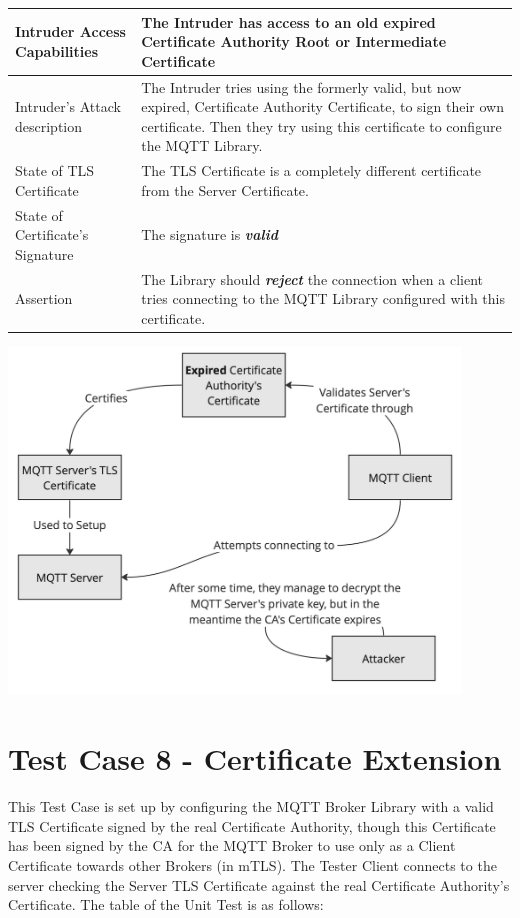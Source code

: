 \documentclass[binding=0.6cm,noexaminfo]{sapthesis}
\begin{document}
\begin{center}
\begin{tabular}{| p{6cm} | p{6cm} |}
\hline
Intruder Access Capabilities & The Intruder has access to an old expired Certificate Authority Root or Intermediate Certificate \\
\hline
Intruder’s Attack description & The Intruder tries using the formerly valid, but now expired, Certificate Authority Certificate, to sign their own certificate. Then they try using this certificate to configure the MQTT Library. \\
\hline
State of TLS Certificate & The TLS Certificate is a completely different certificate from the Server Certificate. \\
\hline
State of Certificate’s Signature & The signature is \textbf{\textit{valid}} \\
\hline
Assertion & The Library should \textbf{\textit{reject}} the connection when a client tries connecting to the MQTT Library configured with this certificate. \\
\hline
\end{tabular}
\end{center}

\includegraphics[width=12cm]{TC7}

\section{Test Case 8 - Certificate Extension}
This Test Case is set up by configuring the MQTT Broker Library with a valid TLS Certificate signed by the real Certificate Authority, though this Certificate has been signed by the CA for the MQTT Broker to use only as a Client Certificate towards other Brokers (in mTLS). The Tester Client connects to the server checking the Server TLS Certificate against the real Certificate Authority’s Certificate. The table of the Unit Test is as follows:
\end{document}
